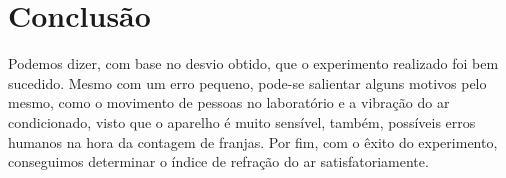 \section{Conclusão}
Podemos dizer, com base no desvio obtido, que o experimento realizado foi bem sucedido. Mesmo com um erro pequeno, pode-se salientar alguns motivos pelo mesmo, como o movimento de pessoas no laboratório e a vibração do ar condicionado, visto que o aparelho é muito sensível, também, possíveis erros humanos na hora da contagem de franjas. Por fim, com o êxito do experimento, conseguimos determinar o índice de refração do ar satisfatoriamente. 
